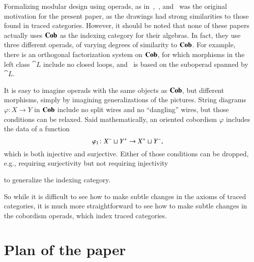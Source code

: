 \documentclass[12pt,oneside,article,draft]{memoir}
\begin{document}
Formalizing modular design using operads, as in~\cite{Spivak},~\cite{RupelSpivak}, and~\cite{VagnerSpivakLerman} was the original motivation for the present paper, as the drawings had strong similarities to those found in traced categories.
However, it should be noted that none of these papers actually uses $\mathbf{Cob}$ as the indexing category for their algebras.
In fact, they use three different operads, of varying degrees of similarity to $\mathbf{Cob}$.
For example, there is an orthogonal factorization system on $\mathbf{Cob}$, for which morphisms in the left class $\cat{L}$ include no closed loops, and~\cite{VagnerSpivakLerman} is based on the suboperad spanned by $\cat{L}$.

It is easy to imagine operads with the same objects as $\mathbf{Cob}$, but different morphisms, simply by imagining generalizations of the pictures.
String diagrams $\varphi\colon X\to Y$ in $\mathbf{Cob}$ include no split wires and no ``dangling'' wires, but those conditions can be relaxed.
Said mathematically, an oriented cobordism $\varphi$ includes the data of a function
$$\varphi_1\colon X^-\sqcup Y^+\to X^+\sqcup Y^-,$$
which is both injective and surjective.
Either of those conditions can be dropped, e.g., requiring surjectivity but not requiring injectivity
\begin{center}
\end{center}
to generalize the indexing category. 

So while it is difficult to see how to make subtle changes in the axioms of traced categories, it is much more straightforward to see how to make subtle changes in the cobordism operads, which index traced categories.

\section{Plan of the paper}
\end{document}
